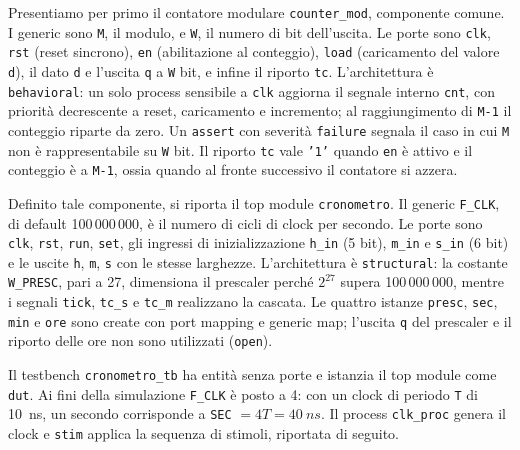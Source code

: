 \implementazione

Presentiamo per primo il contatore modulare \texttt{counter\_mod}, componente comune. I generic sono \texttt{M}, il modulo, e \texttt{W}, il numero di bit dell'uscita. Le porte sono \texttt{clk}, \texttt{rst} (reset sincrono), \texttt{en} (abilitazione al conteggio), \texttt{load} (caricamento del valore \texttt{d}), il dato \texttt{d} e l'uscita \texttt{q} a \texttt{W} bit, e infine il riporto \texttt{tc}. L'architettura è \texttt{behavioral}: un solo process sensibile a \texttt{clk} aggiorna il segnale interno \texttt{cnt}, con priorità decrescente a reset, caricamento e incremento; al raggiungimento di \texttt{M-1} il conteggio riparte da zero. Un \texttt{assert} con severità \texttt{failure} segnala il caso in cui \texttt{M} non è rappresentabile su \texttt{W} bit. Il riporto \texttt{tc} vale \texttt{'1'} quando \texttt{en} è attivo e il conteggio è a \texttt{M-1}, ossia quando al fronte successivo il contatore si azzera.


Definito tale componente, si riporta il top module \texttt{cronometro}. Il generic \texttt{F\_CLK}, di default 100\,000\,000, è il numero di cicli di clock per secondo. Le porte sono \texttt{clk}, \texttt{rst}, \texttt{run}, \texttt{set}, gli ingressi di inizializzazione \texttt{h\_in} (5 bit), \texttt{m\_in} e \texttt{s\_in} (6 bit) e le uscite \texttt{h}, \texttt{m}, \texttt{s} con le stesse larghezze. L'architettura è \texttt{structural}: la costante \texttt{W\_PRESC}, pari a 27, dimensiona il prescaler perché $2^{27}$ supera 100\,000\,000, mentre i segnali \texttt{tick}, \texttt{tc\_s} e \texttt{tc\_m} realizzano la cascata. Le quattro istanze \texttt{presc}, \texttt{sec}, \texttt{min} e \texttt{ore} sono create con port mapping e generic map; l'uscita \texttt{q} del prescaler e il riporto delle ore non sono utilizzati (\texttt{open}).


\simulazione

Il testbench \texttt{cronometro\_tb} ha entità senza porte e istanzia il top module come \texttt{dut}. Ai fini della simulazione \texttt{F\_CLK} è posto a 4: con un clock di periodo \texttt{T} di \SI{10}{ns}, un secondo corrisponde a \texttt{SEC} $= 4T = \SI{40}{ns}$. Il process \texttt{clk\_proc} genera il clock e \texttt{stim} applica la sequenza di stimoli, riportata di seguito.

